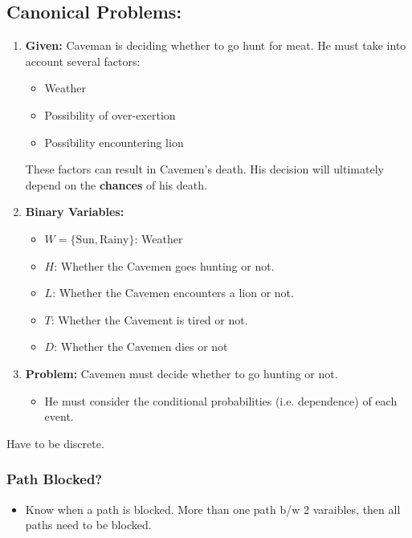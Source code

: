 \subsection{Canonical Problems:}
\begin{example}
    \begin{enumerate}
        \item \textbf{Given:} Caveman is deciding whether to go hunt for meat. He must take into account several factors:
        \begin{itemize}
            \item Weather
            \item Possibility of over-exertion
            \item Possibility encountering lion
        \end{itemize}

        These factors can result in Cavemen's death. His decision will ultimately depend on the \textbf{chances} of his death.
        \item \textbf{Binary Variables:}
        \begin{itemize}
            \item $W = \{\text{Sun}, \text{Rainy}\}$: Weather
            \item $H$: Whether the Cavemen goes hunting or not.
            \item $L$: Whether the Cavemen encounters a lion or not.
            \item $T$: Whether the Cavement is tired or not.
            \item $D$: Whether the Cavemen dies or not
        \end{itemize}
        \item \textbf{Problem:} Cavemen must decide whether to go hunting or not. 
        \begin{itemize}
            \item He must consider the conditional probabilities (i.e. dependence) of each event.
        \end{itemize}
    \end{enumerate}
\end{example}

\begin{warning}
    Have to be discrete. 
\end{warning}
\newpage

\subsubsection{Path Blocked?}
\begin{process}
    \begin{itemize}
        \item Know when a path is blocked. More than one path b/w 2 varaibles, then all paths need to be blocked. 
    \end{itemize}
\end{process}

